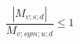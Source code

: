\documentclass[12pt]{article}
\begin{document}
\begin{displaymath}
\frac {|M_{v;s;d}|} {M_{v;sym;u;d}} \leq 1
\end{displaymath}
\end{document}

